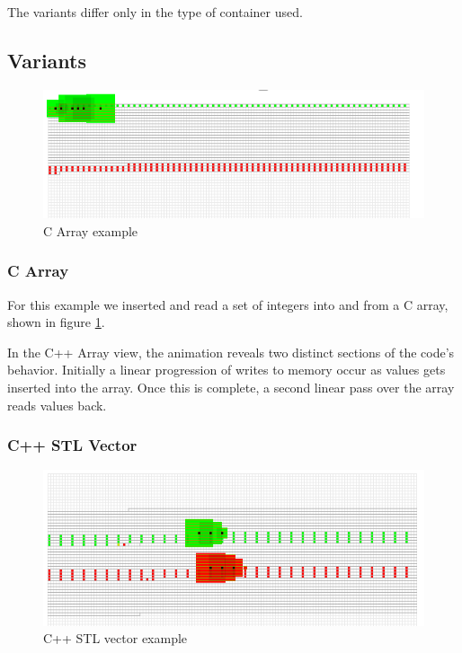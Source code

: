 \documentclass[annual]{acmsiggraph}
\begin{document}
    The variants differ only in the type of container used.

  \subsection{Variants}
  
  \begin{figure}[t]
		\centering
    \includegraphics[scale=0.45]{images/example_array.png}
		\caption{C Array example}
    \label{fig:example_array}
	\end{figure}
  
  \subsubsection{C Array}
  For this example we inserted and read a set of integers into and from a C array, shown in figure \ref{fig:example_array}.
  
  In the C++ Array view, the animation reveals two distinct sections of the code's behavior. Initially a linear progression of writes to memory occur as values gets inserted into the array. Once this is complete, a second linear pass over the array reads values back. 

  \subsubsection{C++ STL Vector}
  
  \begin{figure}[t]
		\centering
    \includegraphics[scale=0.45]{images/example_vector.png}
		\caption{C++ STL vector example}
    \label{fig:example_vector}
	\end{figure}
  
\end{document}
